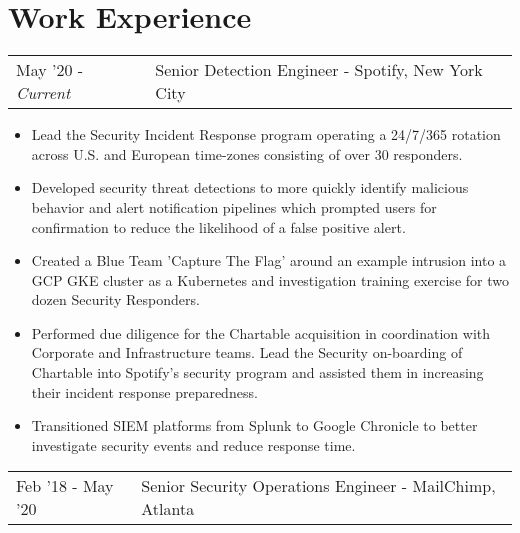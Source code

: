 \documentclass[letterpaper]{article}
\begin{document}
\section*{Work Experience}
\begin{tabular}{l|l}
{May '20 - \emph{Current}} & Senior Detection Engineer - Spotify, New York City\\
\end{tabular}
\begin{itemize}[itemsep=0.5pt]
	\item Lead the Security Incident Response program operating a 24/7/365 rotation across U.S. and European time-zones consisting of over 30 responders.
	\item Developed security threat detections to more quickly identify malicious behavior and alert notification pipelines which prompted users for confirmation to reduce the likelihood of a false positive alert.
	\item Created a Blue Team 'Capture The Flag' around an example intrusion into a GCP GKE cluster as a Kubernetes and investigation training exercise for two dozen Security Responders.
	\item Performed due diligence for the Chartable acquisition in coordination with Corporate and Infrastructure teams. Lead the Security on-boarding of Chartable into Spotify's security program and assisted them in increasing their incident response preparedness.
	\item Transitioned SIEM platforms from Splunk to Google Chronicle to better investigate security events and reduce response time. 
\end{itemize}
\begin{tabular}{l|l}
{Feb '18 - May '20} & Senior Security Operations Engineer - MailChimp, Atlanta\\
\end{tabular}
\end{document}
